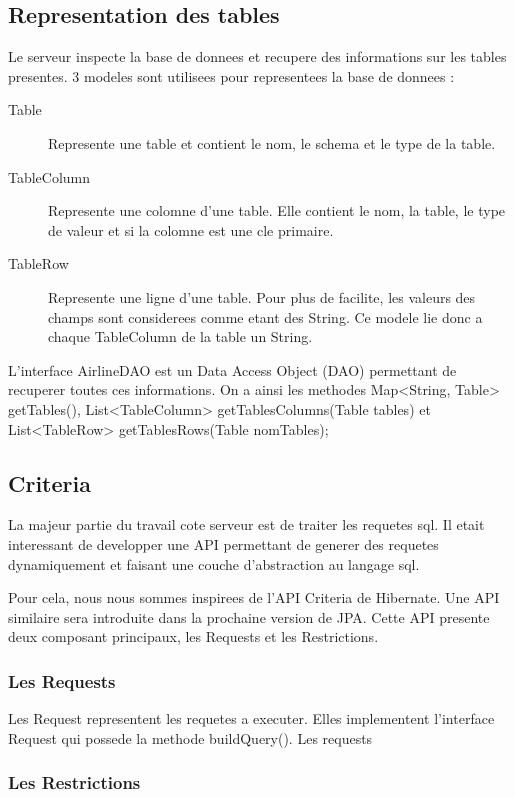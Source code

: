 \subsection{Representation des tables}
Le serveur inspecte la base de donnees et recupere des informations sur les tables presentes. 3 modeles sont utilisees pour representees la base de donnees :
\begin{description}
 \item[Table] Represente une table et contient le nom, le schema et le type de la table.
 \item[TableColumn] Represente une colomne d'une table. Elle contient le nom, la table, le type de valeur et si la colomne est une cle primaire.
 \item[TableRow] Represente une ligne d'une table. Pour plus de facilite, les valeurs des champs sont considerees comme etant des String. Ce modele lie donc a chaque TableColumn de la table un String.
\end{description}
L'interface AirlineDAO est un Data Access Object (DAO) permettant de recuperer toutes ces informations. On a ainsi les methodes Map<String, Table> getTables(), List<TableColumn> getTablesColumns(Table tables) et List<TableRow> getTablesRows(Table nomTables);
\subsection{Criteria}
La majeur partie du travail cote serveur est de traiter les requetes sql. Il etait interessant de developper une API permettant de generer des requetes dynamiquement et faisant une couche d'abstraction au langage sql. 

Pour cela, nous nous sommes inspirees de l'API Criteria de Hibernate. Une API similaire sera introduite dans la prochaine version de JPA. Cette API presente deux composant principaux, les Requests et les Restrictions.
\subsubsection{Les Requests}
Les Request representent les requetes a executer. Elles implementent l'interface Request qui possede la methode buildQuery(). Les requests 
\subsubsection{Les Restrictions}